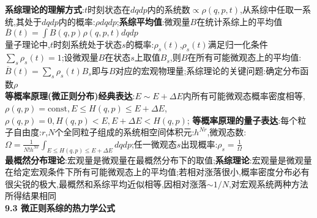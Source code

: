 \documentclass[10pt,a4paper]{article}
\begin{document}
\begin{multicols}{2}
\textbf{系综理论的理解方式}:$t$时刻状态在$dqdp$内的系统数$\propto\rho(q,p,t)$,从系综中任取一系统,其处于$dqdp$内的概率:$\rho dqdp$;\textbf{系综平均值}:微观量$B$在统计系综上的平均值$\overline{B}(t)=\int B(q,p)\rho(q,p,t)dqdp$\\
量子理论中,$t$时刻系统处于状态$s$的概率:$\rho_s(t)$,$\rho_s(t)$满足归一化条件$\sum_s\rho_s(t)=1$;设微观量$B$在状态$s$上取值$B_s$,则$B$在所有可能微观态上的平均值:$\overline{B}(t)=\sum_s\rho_s(t)B_s$即与$B$对应的宏观物理量;系综理论的关键问题:确定分布函数$\rho$\\
\textbf{等概率原理(微正则分布)经典表达}:$E\sim E+\Delta E$内所有可能微观态概率密度相等,$\rho(q,p)=\text{const},E\leq H(q,p)\leq E+\Delta E$,$\rho(q,p)=0,H(q,p)<E,E+\Delta E<H(q,p)$;
\textbf{等概率原理的量子表达}:每个粒子自由度:$r$,$N$个全同粒子组成的系统相空间体积元:$h^{Nr}$,微观态数:$\Omega=\frac{1}{N!h^{Nr}}\int_{E\leq H(q,p)\leq E+\Delta E}dqdp$;任一微观态$s$出现概率:$\rho_s=\frac{1}{\Omega}$\\
\textbf{最概然分布理论}:宏观量是微观量在最概然分布下的取值;\textbf{系综理论}:宏观量是微观量在给定宏观条件下所有可能微观态上的平均值;若相对涨落很小,概率密度分布必有很尖锐的极大,最概然和系综平均近似相等,因相对涨落$\sim1/N$,对宏观系统两种方法所得结果相同\\
\textbf{9.3 微正则系综的热力学公式}

\end{multicols}
\end{document}
